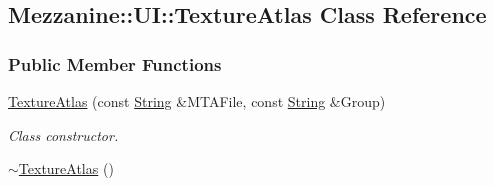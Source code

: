 \hypertarget{classMezzanine_1_1UI_1_1TextureAtlas}{
\subsection{Mezzanine::UI::TextureAtlas Class Reference}
\label{classMezzanine_1_1UI_1_1TextureAtlas}
}
\subsubsection*{Public Member Functions}
\begin{DoxyCompactItemize}
\item 
\hyperlink{classMezzanine_1_1UI_1_1TextureAtlas_a513fdf618f1696ef346c0562f8117d07}{TextureAtlas} (const \hyperlink{namespaceMezzanine_acf9fcc130e6ebf08e3d8491aebcf1c86}{String} \&MTAFile, const \hyperlink{namespaceMezzanine_acf9fcc130e6ebf08e3d8491aebcf1c86}{String} \&Group)
\begin{DoxyCompactList}\small\item\em Class constructor. \item\end{DoxyCompactList}\item 
\hypertarget{classMezzanine_1_1UI_1_1TextureAtlas_a9065829063239fa5b06940a83f2d726c}{
\hyperlink{classMezzanine_1_1UI_1_1TextureAtlas_a9065829063239fa5b06940a83f2d726c}{$\sim$TextureAtlas} ()}
\label{classMezzanine_1_1UI_1_1TextureAtlas_a9065829063239fa5b06940a83f2d726c}


\end{DoxyCompactItemize}
